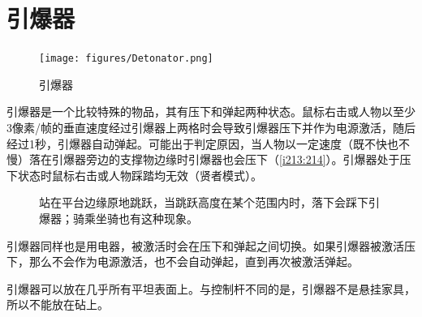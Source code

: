 \section{引爆器}
\begin{figure}[!ht]
\centering
\texttt{[image: figures/Detonator.png]}
\caption{引爆器}
\end{figure}
引爆器是一个比较特殊的物品，其有压下和弹起两种状态。鼠标右击或人物以至少3像素/帧的垂直速度经过引爆器上两格时会导致引爆器压下并作为电源激活，随后经过1秒，引爆器自动弹起。可能出于判定原因，当人物以一定速度（既不快也不慢）落在引爆器旁边的支撑物边缘时引爆器也会压下（\autoref{i213:214}）。引爆器处于压下状态时鼠标右击或人物踩踏均无效（贤者模式）。

\begin{figure}[!ht]
\begin{center}
\qquad
{}
\end{center}
\caption{\protect{}站在平台边缘原地跳跃，当跳跃高度在某个范围内时，落下会踩下引爆器；\protect{}骑乘坐骑也有这种现象。}
\label{i213:214}
\end{figure}

引爆器同样也是用电器，被激活时会在压下和弹起之间切换。如果引爆器被激活压下，那么不会作为电源激活，也不会自动弹起，直到再次被激活弹起。

引爆器可以放在几乎所有平坦表面上。与控制杆不同的是，引爆器不是悬挂家具，所以不能放在砧上。

